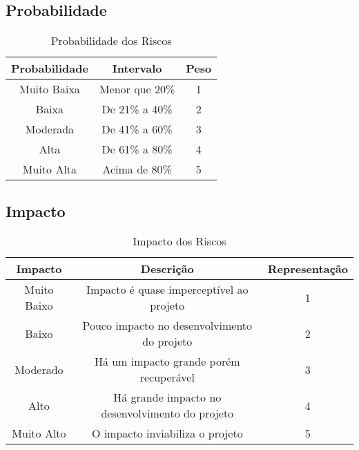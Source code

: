 \subsection{Probabilidade}
\begin{table}[h]
  \centering
  \caption{Probabilidade dos Riscos}
  \begin{tabular}{|c|c|c|}
    \hline
    \textbf{Probabilidade} & \textbf{Intervalo} & \textbf{Peso} \\ \hline
    Muito Baixa            & Menor que 20\%     & 1             \\ \hline
    Baixa                  & De 21\% a 40\%     & 2             \\ \hline
    Moderada               & De 41\% a 60\%     & 3             \\ \hline
    Alta                   & De 61\% a 80\%     & 4             \\ \hline
    Muito Alta             & Acima de 80\%      & 5             \\ \hline
  \end{tabular}
\end{table}

\subsection{Impacto}
\begin{table}[h]
  \centering
  \caption{Impacto dos Riscos}
  \label{my-label}
  \begin{tabular}{|c|c|c|}
    \hline
    \textbf{Impacto} & \textbf{Descrição}                              & \textbf{Representação} \\ \hline
    Muito Baixo      & Impacto é quase imperceptível ao projeto        & 1                      \\ \hline
    Baixo            & Pouco impacto no desenvolvimento do projeto     & 2                      \\ \hline
    Moderado         & Há um impacto grande porém recuperável          & 3                      \\ \hline
    Alto             & Há grande impacto no desenvolvimento do projeto & 4                      \\ \hline
    Muito Alto       & O impacto inviabiliza o projeto                 & 5                      \\ \hline
  \end{tabular}
\end{table}


